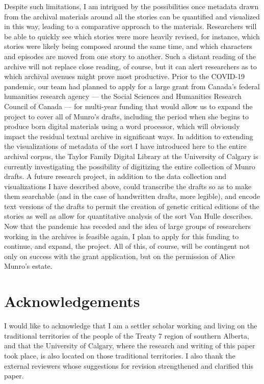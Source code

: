 \documentclass{article}
\begin{document}
Despite such limitations, I am intrigued by the possibilities once
metadata drawn from the archival materials around all the stories can be
quantified and visualized in this way, leading to a comparative approach
to the materials. Researchers will be able to quickly see which stories
were more heavily revised, for instance, which stories were likely being
composed around the same time, and which characters and episodes are
moved from one story to another. Such a distant reading of the archive
will not replace close reading, of course, but it can alert researchers
as to which archival avenues might prove most productive. Prior to the
COVID-19 pandemic, our team had planned to apply for a large grant from
Canada's federal humanities research agency –– the Social Sciences and
Humanities Research Council of Canada –– for multi-year funding that
would allow us to expand the project to cover all of Munro's drafts,
including the period when she begins to produce born digital materials
using a word processor, which will obviously impact the residual textual
archive in significant ways. In addition to extending the visualizations
of metadata of the sort I have introduced here to the entire archival
corpus, the Taylor Family Digital Library at the University of Calgary
is currently investigating the possibility of digitizing the entire
collection of Munro drafts. A future research project, in addition to
the data collection and visualizations I have described above, could
transcribe the drafts so as to make them searchable (and in the case of
handwritten drafts, more legible), and encode text versions of the
drafts to permit the creation of genetic critical editions of the
stories as well as allow for quantitative analysis of the sort Van Hulle
describes. Now that the pandemic has receded and the idea of
large groups of researchers working in the archives is feasible again, I
plan to apply for this funding to continue, and expand, the project. All
of this, of course, will be contingent not only on success with the
grant application, but on the permission of Alice Munro’s estate.

\section*{Acknowledgements}
I would
  like to acknowledge that I am a settler scholar working and living on
  the traditional territories of the people of the Treaty 7 region of
  southern Alberta, and that the University of Calgary, where the
  research and writing of this paper took place, is also located on
  those traditional territories. I also thank the external reviewers
  whose suggestions for revision strengthened and clarified this paper.

\begin{flushleft}
    \renewcommand*{\mkbibnamefamily}[1]{\textsc{#1}}
    \renewcommand*{\mkbibnamegiven}[1]{\textsc{#1}} 
\printbibliography
\end{flushleft}
\end{document}
